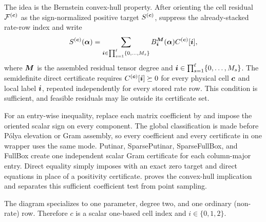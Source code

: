 The idea is the Bernstein convex-hull property. After orienting the cell residual $\mathcal F^{(\boldsymbol{c})}$ as the sign-normalized positive target $S^{(\boldsymbol{c})}$, suppress the already-stacked rate-row index and write
\begin{gather*}
S^{(\boldsymbol{c})}(\boldsymbol{\alpha})=
  \sum_{\boldsymbol{i}\in\prod_{s=1}^{\ell}\{0,\ldots,M_s\}}B_{\boldsymbol{i}}^{\boldsymbol{M}}(\boldsymbol{\alpha})
  C^{(\boldsymbol{c})}[\boldsymbol{i}],
\end{gather*}
where $\boldsymbol{M}$ is the assembled residual tensor degree and $\boldsymbol{i}\in\prod_{s=1}^{\ell}\{0,\ldots,M_s\}$. The semidefinite direct certificate requires $C^{(\boldsymbol{c})}[\boldsymbol{i}]\succeq0$ for every physical cell $\boldsymbol{c}$ and local label $\boldsymbol{i}$, repeated independently for every stored rate row. This condition is sufficient, and feasible residuals may lie outside its certificate set.

For an entry-wise inequality, replace each matrix coefficient by  and impose the oriented scalar sign on every component. The global classification is made before P\'olya elevation or Gram assembly, so every coefficient and every certificate in one wrapper uses the same mode. Putinar, SparsePutinar, SparseFullBox, and FullBox create one independent scalar Gram certificate for each column-major entry. Direct equality simply imposes  with an exact zero target and direct equations in place of a positivity certificate.  proves the convex-hull implication and separates this sufficient coefficient test from point sampling.

\begin{center}
The diagram specializes to one parameter, degree two, and one ordinary (non-rate) row. Therefore $c$ is a scalar one-based cell index and $i\in\{0,1,2\}$.

\end{center}

